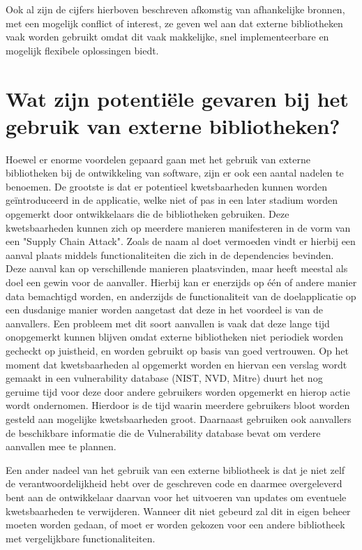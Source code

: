 Ook al zijn de cijfers hierboven beschreven afkomstig van afhankelijke bronnen, met een mogelijk conflict of interest, ze geven wel aan dat externe bibliotheken vaak worden gebruikt omdat dit vaak makkelijke, snel implementeerbare en mogelijk flexibele oplossingen biedt.

\section{Wat zijn potentiële gevaren bij het gebruik van externe bibliotheken?} \label{sec:wat-zijn-potentieel-gevaren-die-het-gebruik-van-externe-bibliotheken?}
Hoewel er enorme voordelen gepaard gaan met het gebruik van externe bibliotheken bij de ontwikkeling van software, zijn er ook een aantal nadelen te benoemen. De grootste is dat er potentieel kwetsbaarheden kunnen worden geïntroduceerd in de applicatie, welke niet of pas in een later stadium worden opgemerkt door ontwikkelaars die de bibliotheken gebruiken. Deze kwetsbaarheden kunnen zich op meerdere manieren manifesteren in de vorm van een "Supply Chain Attack". Zoals de naam al doet vermoeden vindt er hierbij een aanval plaats middels functionaliteiten die zich in de dependencies bevinden. Deze aanval kan op verschillende manieren plaatsvinden, maar heeft meestal als doel een gewin voor de aanvaller. Hierbij kan er enerzijds op één of andere manier data bemachtigd worden, en anderzijds de functionaliteit van de doelapplicatie op een dusdanige manier worden aangetast dat deze in het voordeel is van de aanvallers. Een probleem met dit soort aanvallen is vaak dat deze lange tijd onopgemerkt kunnen blijven omdat externe bibliotheken niet periodiek worden gecheckt op juistheid, en worden gebruikt op basis van goed vertrouwen. Op het moment dat kwetsbaarheden al opgemerkt worden en hiervan een verslag wordt gemaakt in een vulnerability database (NIST, NVD, Mitre) duurt het nog geruime tijd voor deze door andere gebruikers worden opgemerkt en hierop actie wordt ondernomen. Hierdoor is de tijd waarin meerdere gebruikers bloot worden gesteld aan mogelijke kwetsbaarheden groot. Daarnaast gebruiken ook aanvallers de beschikbare informatie die de Vulnerability database bevat om verdere aanvallen mee te plannen.

Een ander nadeel van het gebruik van een externe bibliotheek is dat je niet zelf de verantwoordelijkheid hebt over de geschreven code en daarmee overgeleverd bent aan de ontwikkelaar daarvan voor het uitvoeren van updates om eventuele kwetsbaarheden te verwijderen. Wanneer dit niet gebeurd zal dit in eigen beheer moeten worden gedaan, of moet er worden gekozen voor een andere bibliotheek met vergelijkbare functionaliteiten.

